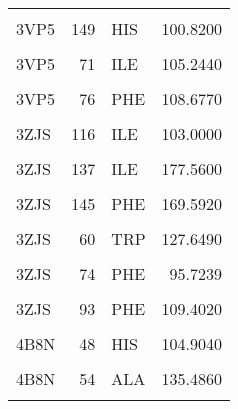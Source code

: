 \begin{table}
\begin{tabular}{lrlr}
			\cellcolor{gray!6}{3VP5} & \cellcolor{gray!6}{148} & \cellcolor{gray!6}{VAL} & \cellcolor{gray!6}{110.6600}\\
			3VP5 & 149 & HIS & 100.8200\\
			\addlinespace
			\cellcolor{gray!6}{3VP5} & \cellcolor{gray!6}{68} & \cellcolor{gray!6}{THR} & \cellcolor{gray!6}{105.7800}\\
			3VP5 & 71 & ILE & 105.2440\\
			\cellcolor{gray!6}{3VP5} & \cellcolor{gray!6}{72} & \cellcolor{gray!6}{HIS} & \cellcolor{gray!6}{101.6570}\\
			3VP5 & 76 & PHE & 108.6770\\
			\cellcolor{gray!6}{3VP5} & \cellcolor{gray!6}{91} & \cellcolor{gray!6}{TYR} & \cellcolor{gray!6}{135.6840}\\
			\addlinespace
			3ZJS & 116 & ILE & 103.0000\\
			\cellcolor{gray!6}{3ZJS} & \cellcolor{gray!6}{120} & \cellcolor{gray!6}{HIS} & \cellcolor{gray!6}{110.7000}\\
			3ZJS & 137 & ILE & 177.5600\\
			\cellcolor{gray!6}{3ZJS} & \cellcolor{gray!6}{142} & \cellcolor{gray!6}{LEU} & \cellcolor{gray!6}{80.1179}\\
			3ZJS & 145 & PHE & 169.5920\\
			\addlinespace
			\cellcolor{gray!6}{3ZJS} & \cellcolor{gray!6}{185} & \cellcolor{gray!6}{TRP} & \cellcolor{gray!6}{163.3900}\\
			3ZJS & 60 & TRP & 127.6490\\
			\cellcolor{gray!6}{3ZJS} & \cellcolor{gray!6}{61} & \cellcolor{gray!6}{TYR} & \cellcolor{gray!6}{78.2808}\\
			3ZJS & 74 & PHE & 95.7239\\
			\cellcolor{gray!6}{3ZJS} & \cellcolor{gray!6}{89} & \cellcolor{gray!6}{VAL} & \cellcolor{gray!6}{125.8290}\\
			\addlinespace
			3ZJS & 93 & PHE & 109.4020\\
			\cellcolor{gray!6}{4B8N} & \cellcolor{gray!6}{44} & \cellcolor{gray!6}{PHE} & \cellcolor{gray!6}{119.7920}\\
			4B8N & 48 & HIS & 104.9040\\
			\cellcolor{gray!6}{4B8N} & \cellcolor{gray!6}{49} & \cellcolor{gray!6}{PRO} & \cellcolor{gray!6}{79.7519}\\
			4B8N & 54 & ALA & 135.4860\\
			\addlinespace
			\cellcolor{gray!6}{4B8N} & \cellcolor{gray!6}{55} & \cellcolor{gray!6}{ILE} & \cellcolor{gray!6}{101.7060}\\

\end{tabular}
\end{table}
